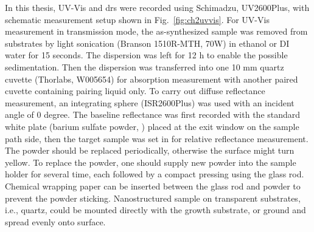 In this thesis, UV-Vis and \gls{drs} were recorded using Schimadzu, UV2600Plus, with schematic measurement setup shown in Fig.~\ref{fig:ch2uvvis}. For UV-Vis measurement in transmission mode, the as-synthesized sample was removed from substrates by light sonication (Branson 1510R-MTH, 70W) in ethanol or DI water for 15 seconds. The dispersion was left for 12 h to enable the possible sedimentation. Then the dispersion was transferred into one 10 mm quartz cuvette (Thorlabs, W005654) for absorption measurement with another paired cuvette containing pairing liquid only. To carry out diffuse reflectance measurement, an integrating sphere (ISR2600Plus) was used with an incident angle of 0 degree. The baseline reflectance was first recorded with the standard white plate (barium sulfate powder, ) placed at the exit window on the sample path side, then the target sample was set in for relative reflectance measurement. The  powder should be replaced periodically, otherwise the surface might turn yellow. To replace the  powder, one should supply new powder into the sample holder for several time, each followed by a compact pressing using the glass rod. Chemical wrapping paper can be inserted between the glass rod and  powder to prevent the powder sticking. Nanostructured sample on transparent substrates, i.e., quartz, could be mounted directly with the growth substrate, or ground and spread evenly onto  surface.\cite{isr2011}
